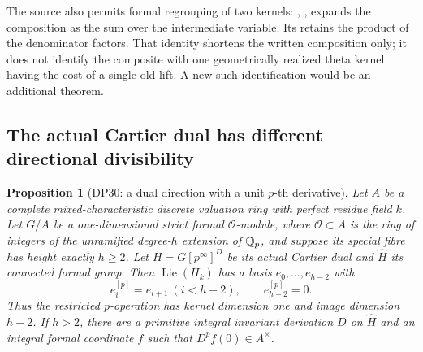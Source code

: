 \documentclass[11pt,a4paper]{article}
\newtheorem{proposition}[theorem]{Proposition}
\theoremstyle{definition}\newtheorem{remark}[theorem]{Remark}
\newcommand{\Lie}{\operatorname{Lie}}\newcommand{\Dist}{\operatorname{Dist}}
\begin{document}
The source also permits formal regrouping of two kernels: , , expands the composition as the sum over the intermediate variable. Its  retains the product of the denominator factors. That identity shortens the written composition only; it does not identify the composite with one geometrically realized theta kernel having the cost of a single old lift. A new such identification would be an additional theorem.

\subsection{The actual Cartier dual has different directional divisibility}

\begin{proposition}[DP30: a dual direction with a unit $p$-th derivative]\label{DP30}
Let $A$ be a complete mixed-characteristic discrete valuation ring with perfect residue field $k$. Let $G/A$ be a one-dimensional strict formal $\mathcal O$-module, where $\mathcal O\subset A$ is the ring of integers of the unramified degree-$h$ extension of $\mathbb Q_p$, and suppose its special fibre has height exactly $h\ge2$. Let $H=G[p^\infty]^D$ be its actual Cartier dual and $\widehat H$ its connected formal group. Then $\Lie(H_k)$ has a basis $e_0,\ldots,e_{h-2}$ with
\[
 e_i^{[p]}=e_{i+1}\ (i<h-2),\qquad e_{h-2}^{[p]}=0.
\]
Thus the restricted $p$-operation has kernel dimension one and image dimension $h-2$. If $h>2$, there are a primitive integral invariant derivation $D$ on $\widehat H$ and an integral formal coordinate $f$ such that $D^pf(0)\in A^\times$.
\end{proposition}
\end{document}
